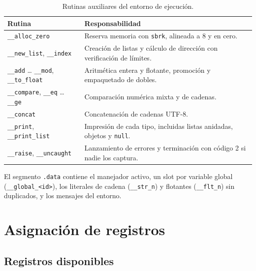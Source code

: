 \documentclass[11pt,a4paper]{article}
\begin{document}
\begin{table}[H]
\centering
\small
\begin{tabular}{@{}L{4.4cm}L{9.8cm}@{}}
\toprule
\textbf{Rutina} & \textbf{Responsabilidad} \\
\midrule
\texttt{\_\_alloc\_zero} & Reserva memoria con \texttt{sbrk}, alineada a 8 y en cero. \\
\texttt{\_\_new\_list}, \texttt{\_\_index} & Creación de listas y cálculo de
dirección con verificación de límites. \\
\texttt{\_\_add} \dots{} \texttt{\_\_mod}, \texttt{\_\_to\_float} &
Aritmética entera y flotante, promoción y empaquetado de dobles. \\
\texttt{\_\_compare}, \texttt{\_\_eq} \dots{} \texttt{\_\_ge} & Comparación
numérica mixta y de cadenas. \\
\texttt{\_\_concat} & Concatenación de cadenas UTF-8. \\
\texttt{\_\_print}, \texttt{\_\_print\_list} & Impresión de cada tipo, incluidas
listas anidadas, objetos y \texttt{null}. \\
\texttt{\_\_raise}, \texttt{\_\_uncaught} & Lanzamiento de errores y
terminación con código 2 si nadie los captura. \\
\bottomrule
\end{tabular}
\caption{Rutinas auxiliares del entorno de ejecución.}
\end{table}

El segmento \texttt{.data} contiene el manejador activo, un slot por variable
global (\texttt{\_\_global\_<id>}), los literales de cadena
(\texttt{\_\_str\_n}) y flotantes (\texttt{\_\_flt\_n}) sin duplicados, y los
mensajes del entorno.

\section{Asignación de registros}

\subsection{Registros disponibles}
\end{document}
